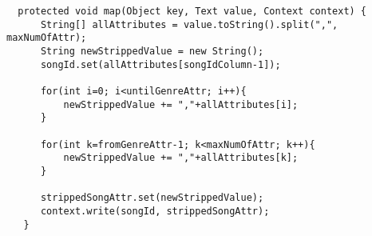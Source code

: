
\begin{lstlisting}
  protected void map(Object key, Text value, Context context) {
      String[] allAttributes = value.toString().split(",", maxNumOfAttr);
      String newStrippedValue = new String();
      songId.set(allAttributes[songIdColumn-1]);
      
      for(int i=0; i<untilGenreAttr; i++){
          newStrippedValue += ","+allAttributes[i];
      }
      
      for(int k=fromGenreAttr-1; k<maxNumOfAttr; k++){
          newStrippedValue += ","+allAttributes[k];
      }
      
      strippedSongAttr.set(newStrippedValue);
      context.write(songId, strippedSongAttr);
   }
\end{lstlisting}
